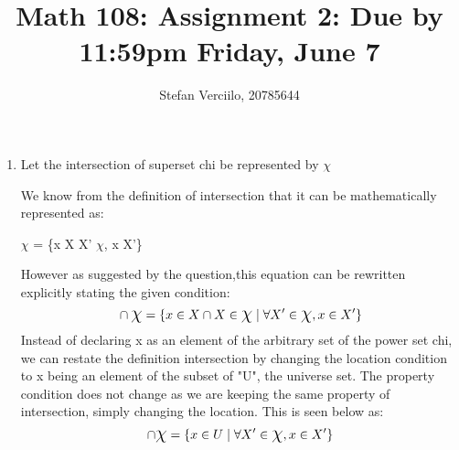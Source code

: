 \documentclass[11pt]{article}
\begin{document}
\author{Stefan Verciilo, 20785644}
\title{Math 108: Assignment 2: Due by 11:59pm Friday, June 7}
\maketitle

\medskip


\begin{enumerate}


\item 

Let the intersection of superset chi  be represented by \cap \mbox{\Large$\chi$} 

We know from the definition of intersection that it can be mathematically represented as:


 \cap \mbox{\Large$\chi$} = \{x \in X \mid \forall X' \in \mbox{\Large$\chi$}, x \in X'\}


However as suggested by the question,this equation can be rewritten explicitly stating the given condition: 
\begin{equation}
    \newline  \cap \mbox{\Large$\chi$} = \{x  \in X \cap X \in \mbox{\Large$\chi$} \mid \forall X' \in \mbox{\Large$\chi$}, x \in X'\}\\
\end{equation}
Instead of declaring x as an element of the arbitrary set of the power set chi, we can restate the definition intersection by changing the location condition to x being an element of the subset of "U", the universe set. The property condition does not change as we are keeping the same property of intersection, simply changing the location. This is seen below as: 
\begin{equation}
    \cap \mbox{\Large$\chi$} = \{x  \in  U \mid \forall X' \in \mbox{\Large$\chi$}, x \in X'\}\\
\end{equation}


\end{enumerate}
\end{document}
